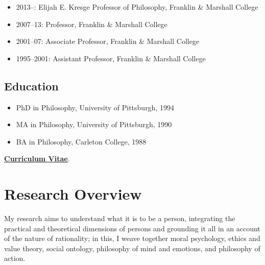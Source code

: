 \documentclass[11pt]{article}
\begin{document}
\begin{itemize}
  \item 2013--: Elijah E. Kresge Professor of Philosophy, Franklin \& {} Marshall College
  \item 2007--13: Professor, Franklin \& {} Marshall College
  \item 2001--07: Associate Professor, Franklin \& {} Marshall College
  \item 1995--2001: Assistant Professor, Franklin \& {} Marshall College
\end{itemize}

\subsection*{Education}

\begin{itemize}
  \item PhD in Philosophy, University of Pittsburgh, 1994
  \item MA in Philosophy, University of Pittsburgh, 1990
  \item BA in Philosophy, Carleton College, 1988
\end{itemize}

\noindent\href{https://drive.google.com/file/d/1-8fjo2F9EzgfDyYo_WSTYhaU-xrDNU8P/view}{\textbf{Curriculum Vitae}}.

\section[Research]{Research Overview}

My research aims to understand what it is to be a person, integrating the practical and theoretical dimensions of persons and grounding it all in an account of the nature of rationality; in this, I weave together moral psychology, ethics and value theory, social ontology, philosophy of mind and emotions, and philosophy of action.
\end{document}
